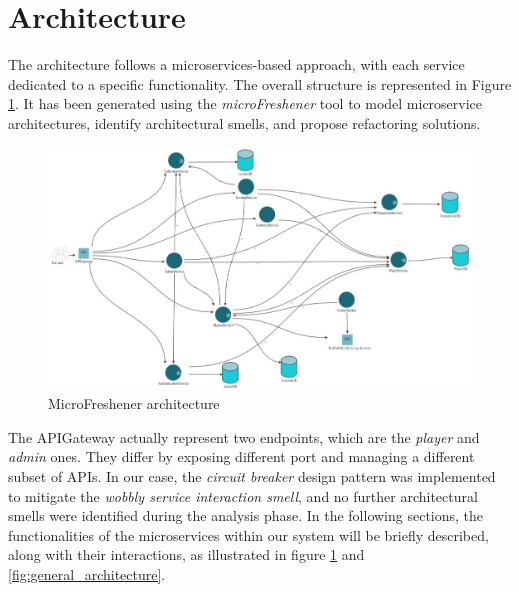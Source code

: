 \documentclass{article}
\begin{document}
\newpage
\section{Architecture}
The architecture follows a microservices-based approach, with each service dedicated to a specific functionality. The overall structure is represented in Figure \ref{fig:microfreshener_architecture}. It has been generated using the \emph{microFreshener} tool to model microservice architectures, identify architectural smells, and propose refactoring solutions.
\begin{figure}[ht]
    \centering
    \includegraphics[width=12cm]{microfreshener/microFreshenerFinal.jpeg}
    \caption{MicroFreshener architecture}
    \label{fig:microfreshener_architecture}
\end{figure}

The APIGateway actually represent two endpoints, which are the \emph{player} and \emph{admin} ones. They differ by exposing different port and managing a different subset of APIs. In our case, the \emph{circuit breaker} design pattern was implemented to mitigate the \emph{wobbly service interaction smell}, and no further architectural smells were identified during the analysis phase.
\newline
In the following sections, the functionalities of the microservices within our system will be briefly described, along with their interactions, as illustrated in figure \ref{fig:microfreshener_architecture} and \ref{fig:general_architecture}.
\end{document}
